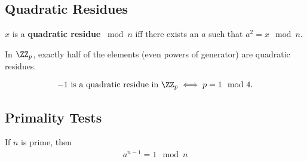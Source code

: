\hypertarget{quadratic-residues}{%
\subsection{Quadratic Residues}\label{quadratic-residues}}

\begin{definition}

\(x\) is a \textbf{quadratic residue} \(\bmod n\) iff there exists an
\(a\) such that \(a^2 = x \mod n\).

\end{definition}

\begin{proposition}[?]

In \(\ZZ_p\), exactly half of the elements (even powers of generator)
are quadratic residues.

\end{proposition}

\begin{proposition}[?]

\begin{align*}  
-1\text{ is a quadratic residue in } \ZZ_p \iff p = 1 \mod 4
.\end{align*}

\end{proposition}

\begin{definition}


\end{definition}

\begin{definition}


\end{definition}

\hypertarget{primality-tests}{%
\subsection{Primality Tests}\label{primality-tests}}

\begin{proposition}

If \(n\) is prime, then
\begin{align*}
a^{n-1} = 1 \mod n
\end{align*}

\end{proposition}


